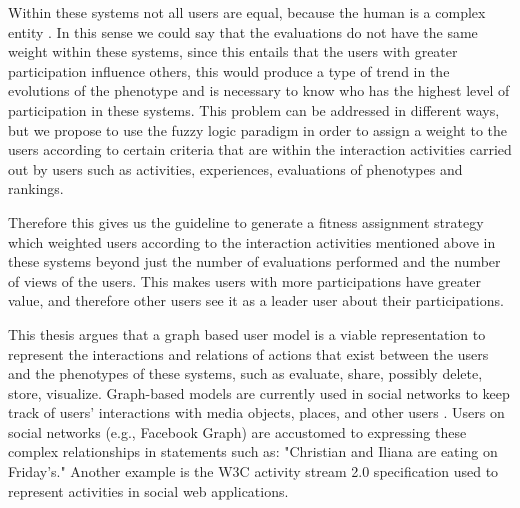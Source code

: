 \par Within these systems not all users are equal, because the human is a complex
entity \cite{mitchell2009complexity}. In this sense we could say that the
evaluations do not have the same weight within these systems, since this entails
that the users with greater participation influence others, this would produce a
type of trend in the evolutions of the phenotype and is necessary to know who
has the highest level of participation in these systems. This problem can be
addressed in different ways, but we propose to use the fuzzy logic paradigm
\cite{Zadeh1973}\cite{TakagiSugeno1983}\cite{ohsaki1998input}in order to assign
a weight to the users according to certain criteria that are within the
interaction activities carried out by users such as activities, experiences,
evaluations of phenotypes and rankings.

\par Therefore this gives us the guideline to generate a fitness assignment
strategy which weighted users according to the interaction activities mentioned
above in these systems beyond just the number of evaluations performed and the
number of views of the users. This makes users with more participations have
greater value, and therefore other users see it as a leader user about their
participations.

\par This thesis argues that a graph based user model is a viable representation to
represent the interactions and relations of actions that exist between the users
and the phenotypes of these systems, such as evaluate, share, possibly delete,
store, visualize. Graph-based models are currently used in social networks to
keep track of users' interactions with media objects, places, and other users
\cite{bondy1976graph, miller2013graph, holzschuher2013performance}. Users on
social networks (e.g., Facebook Graph) are accustomed to expressing these
complex relationships in statements such as: "Christian and Iliana are eating on
Friday's." Another example is the W3C activity stream 2.0 specification used to
represent activities in social web applications.

